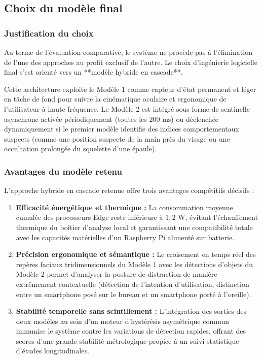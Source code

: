 \subsection{Choix du modèle final}

\subsubsection{Justification du choix}

Au terme de l'évaluation comparative, le système ne procède pas à l'élimination de l'une des approches au profit exclusif de l'autre. Le choix d'ingénierie logicielle final s'est orienté vers un **modèle hybride en cascade**. 

Cette architecture exploite le Modèle 1 comme capteur d'état permanent et léger en tâche de fond pour suivre la cinématique oculaire et ergonomique de l'utilisateur à haute fréquence. Le Modèle 2 est intégré sous forme de sentinelle asynchrone activée périodiquement (toutes les $200\text{ ms}$) ou déclenchée dynamiquement si le premier modèle identifie des indices comportementaux suspects (comme une position suspecte de la main près du visage ou une occultation prolongée du squelette d'une épaule).

\subsubsection{Avantages du modèle retenu}

L'approche hybride en cascade retenue offre trois avantages compétitifs décisifs :
\begin{enumerate}
    \item \textbf{Efficacité énergétique et thermique :} La consommation moyenne cumulée des processeurs Edge reste inférieure à $1,2\text{ W}$, évitant l'échauffement thermique du boîtier d'analyse local et garantissant une compatibilité totale avec les capacités matérielles d'un Raspberry Pi alimenté sur batterie.
    \item \textbf{Précision ergonomique et sémantique :} Le croisement en temps réel des repères faciaux tridimensionnels du Modèle 1 avec les détections d'objets du Modèle 2 permet d'analyser la posture de distraction de manière extrêmement contextuelle (détection de l'intention d'utilisation, distinction entre un smartphone posé sur le bureau et un smartphone porté à l'oreille).
    \item \textbf{Stabilité temporelle sans scintillement :} L'intégration des sorties des deux modèles au sein d'un moteur d'hystérésis asymétrique commun immunise le système contre les variations de détection rapides, offrant des scores d'une grande stabilité métrologique propice à un suivi statistique d'études longitudinales.
\end{enumerate}

